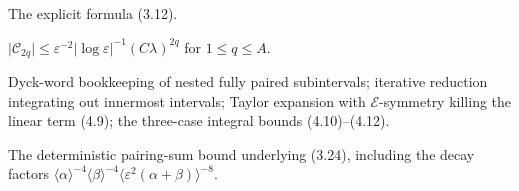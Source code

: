 \begin{proposition}\label{P-3.3}
  \leanok
  The explicit formula (3.12).
\end{proposition}

\begin{proposition}\label{P-3.5a}
  \leanok
  \(\lvert\mathcal{C}_{2q}\rvert \le \varepsilon^{-2}
  \lvert\log\varepsilon\rvert^{-1}(C\lambda)^{2q}\) for \(1 \le q \le A\).
\end{proposition}

\begin{lemma}\label{R-322}
  \leanok
  Dyck-word bookkeeping of nested fully paired subintervals; iterative
  reduction integrating out innermost intervals; Taylor expansion with
  \(\mathcal{E}\)-symmetry killing the linear term (4.9); the three-case
  integral bounds (4.10)--(4.12).
\end{lemma}

\begin{proposition}\label{P-3.5b-det}
  \leanok
  The deterministic pairing-sum bound underlying (3.24), including the
  decay factors
  \(\langle\alpha\rangle^{-4}\langle\beta\rangle^{-4}
  \langle\varepsilon^2(\alpha+\beta)\rangle^{-8}\).
\end{proposition}

